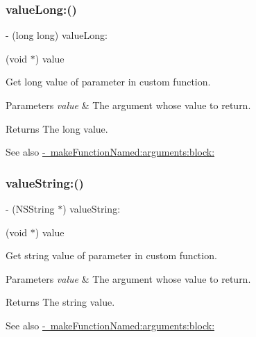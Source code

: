 \subsubsection{\texorpdfstring{value\+Long\+:()}{valueLong:()}}
{\footnotesize\ttfamily -\/ (long long) value\+Long\+: \begin{DoxyParamCaption}\item[{(void $\ast$)}]{value }\end{DoxyParamCaption}}

Get long value of parameter in custom function.


\begin{DoxyParams}{Parameters}
{\em value} & The argument whose value to return. \\
\hline
\end{DoxyParams}
\begin{DoxyReturn}{Returns}
The long value.
\end{DoxyReturn}
\begin{DoxySeeAlso}{See also}
\mbox{\hyperlink{interface_o_p_t_l_y_f_m_d_b_database_af2c3e10041c8d0a95e2feb84a2ffa645}{-\/ make\+Function\+Named\+:arguments\+:block\+:}} 
\end{DoxySeeAlso}
\mbox{\label{interface_o_p_t_l_y_f_m_d_b_database_ab21c078e774eff96b5bcbd0d2c66823b}} 
\subsubsection{\texorpdfstring{value\+String\+:()}{valueString:()}}
{\footnotesize\ttfamily -\/ (N\+S\+String $\ast$) value\+String\+: \begin{DoxyParamCaption}\item[{(void $\ast$)}]{value }\end{DoxyParamCaption}}

Get string value of parameter in custom function.


\begin{DoxyParams}{Parameters}
{\em value} & The argument whose value to return. \\
\hline
\end{DoxyParams}
\begin{DoxyReturn}{Returns}
The string value.
\end{DoxyReturn}
\begin{DoxySeeAlso}{See also}
\mbox{\hyperlink{interface_o_p_t_l_y_f_m_d_b_database_af2c3e10041c8d0a95e2feb84a2ffa645}{-\/ make\+Function\+Named\+:arguments\+:block\+:}} 
\end{DoxySeeAlso}



